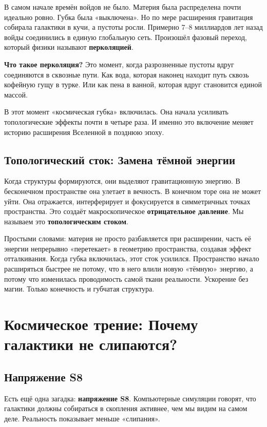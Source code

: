 \documentclass[12pt,a4paper,oneside]{book}
\begin{document}
В самом начале времён войдов не было. Материя была распределена почти идеально ровно. Губка была «выключена». Но по мере расширения гравитация собирала галактики в кучи, а пустоты росли. Примерно 7–8 миллиардов лет назад войды соединились в единую глобальную сеть. Произошёл фазовый переход, который физики называют \textbf{перколяцией}.

\textbf{Что такое перколяция?} Это момент, когда разрозненные пустоты вдруг соединяются в сквозные пути. Как вода, которая наконец находит путь сквозь кофейную гущу в турке. Или как пена в ванной, которая вдруг становится единой массой.

В этот момент «космическая губка» включилась. Она начала усиливать топологические эффекты почти в четыре раза. И именно это включение меняет историю расширения Вселенной в позднюю эпоху.

\section{Топологический сток: Замена тёмной энергии}

Когда структуры формируются, они выделяют гравитационную энергию. В бесконечном пространстве она улетает в вечность. В конечном торе она не может уйти. Она отражается, интерферирует и фокусируется в симметричных точках пространства. Это создаёт макроскопическое \textbf{отрицательное давление}. Мы называем это \textbf{топологическим стоком}.

Простыми словами: материя не просто разбавляется при расширении, часть её энергии непрерывно «перетекает» в геометрию пространства, создавая эффект отталкивания. Когда губка включилась, этот сток усилился. Пространство начало расширяться быстрее не потому, что в него влили новую «тёмную» энергию, а потому что изменилась проводимость самой ткани реальности. Ускорение без магии. Только конечность и губчатая структура.

\chapter{Космическое трение: Почему галактики не слипаются?}

\section{Напряжение S8}

Есть ещё одна загадка: \textbf{напряжение S8}. Компьютерные симуляции говорят, что галактики должны собираться в скопления активнее, чем мы видим на самом деле. Реальность показывает меньше «слипания».
\end{document}
